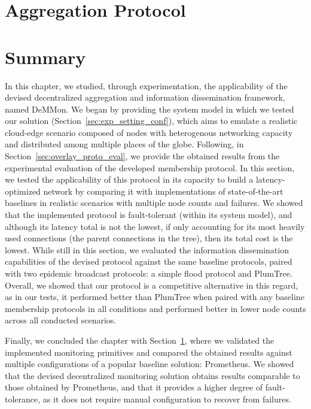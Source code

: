 \section{Aggregation Protocol} \label{sec:agg_proto_eval} 

\section{Summary}

In this chapter, we studied, through experimentation, the applicability of the devised decentralized aggregation and information dissemination framework, named DeMMon. We began by providing the system model in which we tested our solution (Section~\ref{sec:exp_setting_conf}), which aims to emulate a realistic cloud-edge scenario composed of nodes with heterogenous networking capacity and distributed among multiple places of the globe. Following, in Section~\ref{sec:overlay_proto_eval}, we provide the obtained results from the experimental evaluation of the developed membership protocol. In this section, we tested the applicability of this protocol in its capacity to build a latency-optimized network by comparing it with implementations of state-of-the-art baselines in realistic scenarios with multiple node counts and failures. We showed that the implemented protocol is fault-tolerant (within its system model), and although its latency total is not the lowest, if only accounting for its most heavily used connections (the parent connections in the tree), then its total cost is the lowest. While still in this section, we evaluated the information dissemination capabilities of the devised protocol against the same baseline protocols, paired with two epidemic broadcast protocols: a simple flood protocol and PlumTree. Overall, we showed that our protocol is a competitive alternative in this regard, as in our tests, it performed better than PlumTree when paired with any baseline membership protocols in all conditions and performed better in lower node counts across all conducted scenarios.

Finally, we concluded the chapter with Section~\ref{sec:agg_proto_eval}, where we validated the implemented monitoring primitives and compared the obtained results against multiple configurations of a popular baseline solution: Prometheus. We showed that the devised decentralized monitoring solution obtains results comparable to those obtained by Prometheus, and that it provides a higher degree of fault-tolerance, as it does not require manual configuration to recover from failures. 